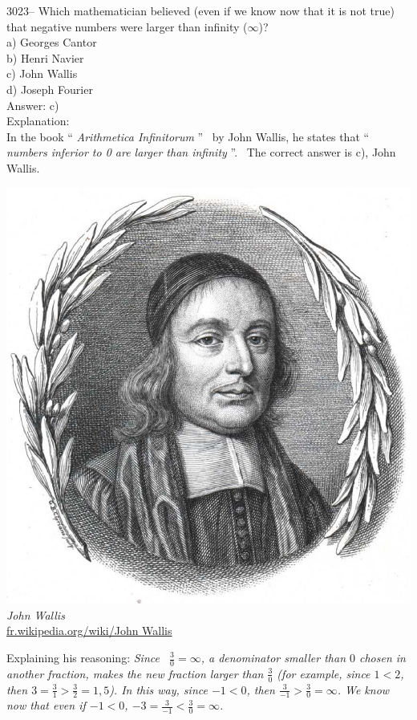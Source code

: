 \documentclass[letterpaper, 12pt]{article}
\begin{document}
3023-- Which mathematician believed (even if we know now that it is not true) that negative numbers were larger than infinity ($\infty$)?\\

a) Georges Cantor\\
b) Henri Navier\\
c) John Wallis\\
d) Joseph Fourier\\

Answer: c)\\

Explanation:\\
In the book `` \emph{Arithmetica Infinitorum} '' \ by John Wallis, he states that `` \emph{numbers inferior to 0 are larger than infinity} ''. \ The correct answer is c), John Wallis.
\begin{center}
\includegraphics[scale=0.2]{John_Wallis.eps}\\
\emph{{\small John Wallis}}\\
\href{http://fr.wikipedia.org/wiki/John Wallis}{fr.wikipedia.org/wiki/John Wallis}
\end{center}

Explaining his reasoning: \emph{Since \ $\frac{3}{0} = \infty$, a denominator smaller than $0$ chosen in another fraction, makes the new fraction larger than $\frac{3}{0}$ (for example, since $1 < 2$, then $3 = \frac{3}{1} > \frac{3}{2} = 1,5$). In this way, since $-1 < 0$, then $\frac{3}{-1} > \frac{3}{0} = \infty$. We know now that even if $-1 < 0$, $-3 = \frac{3}{-1} < \frac{3}{0} = \infty$.}\\
\end{document}
